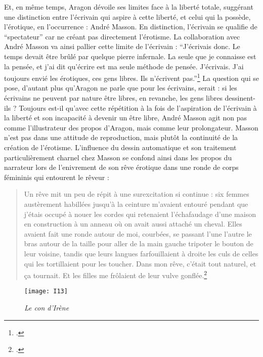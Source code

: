 	Et, en même temps, Aragon dévoile ses limites face à la liberté totale, suggérant une distinction entre l’écrivain qui aspire à cette liberté, et celui qui la possède, l’érotique, en l’occurrence : André Masson. En distinction, l’écrivain se qualifie de \enquote{spectateur} car ne créant pas directement l’érotisme. La collaboration avec André Masson va ainsi  pallier cette limite de l’écrivain : \enquote{J'écrivais donc. Le temps devait être brûlé par quelque pierre infernale. La seule que je connaisse est la pensée, et j’ai dit qu’écrire est ma seule méthode de pensée. J’écrivais. J’ai toujours envié les érotiques, ces gens libres. Ils n’écrivent pas.}\footcite[p270]{defense} La question qui se pose, d’autant plus qu’Aragon ne parle que pour les écrivains, serait : si les écrivains ne peuvent par nature être libres, en revanche, les gens libres dessinent-ils ? Toujours est-il qu’avec cette répétition à la fois de l’aspiration de l’écrivain à la liberté et son incapacité à devenir un être libre, André Masson agit non pas comme l’illustrateur des propos d’Aragon, mais comme leur prolongateur. Masson n’est pas dans une attitude de reproduction, mais plutôt la continuité de la création de l’érotisme. L'influence du dessin automatique et son traitement particulièrement charnel chez Masson se confond ainsi dans les propos du narrateur lors de l'enivrement de son rêve érotique dans une ronde de corps fémininis qui entourent le rêveur :

	\begin{quote}
	Un rêve mit un peu de répit à une surexcitation si continue : six femmes austèrement habillées jusqu’à la ceinture m’avaient entouré pendant que j’étais occupé à nouer les cordes qui retenaient l’échafaudage d’une maison en construction à un anneau où on avait aussi attaché un cheval.
	Elles avaient fait une ronde autour de moi, courbées, se passant l’une l’autre le bras autour de la taille pour aller de la main gauche tripoter le bouton de leur voisine, tandis que leurs langues farfouillaient à droite les culs de celles qui les tortillaient pour les toucher. Dans mon rêve, c’était tout naturel, et ça tournait. Et les filles me frôlaient de leur vulve gonflée.\footcite[p260]{defense}	
	\end{quote} 
	
	\begin{figure*}[htp]
        \centering
        \texttt{[image: I13]}   
        \caption{\emph{Le con d'Irène}}\label{fig:irene1}
	\end{figure*}

